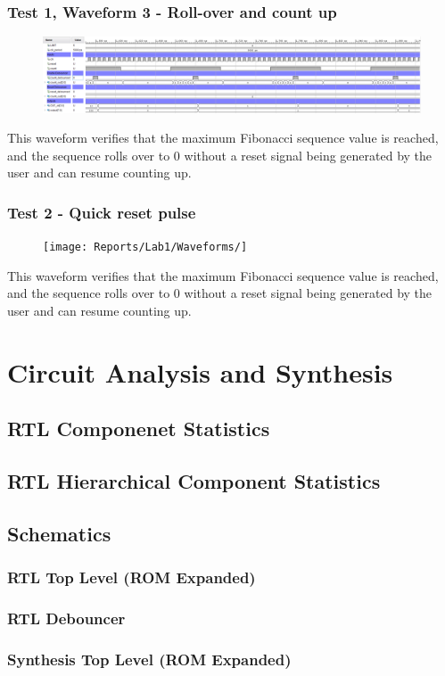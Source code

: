 \documentclass[11pt]{report}
\begin{document}
\subsubsection*{Test 1, Waveform 3 - Roll-over and count up}
\begin{figure}[H]
    \includegraphics[width=\columnwidth]{Reports/Lab1/Waveforms/04_roll-over-and-count.png}
\end{figure}
This waveform verifies that the maximum Fibonacci sequence value is reached, and the sequence rolls over to 0 without a reset signal being generated by the user and can resume counting up.

\subsubsection*{Test 2 - Quick reset pulse}
\begin{figure}[H]
    \texttt{[image: Reports/Lab1/Waveforms/]}
\end{figure}
This waveform verifies that the maximum Fibonacci sequence value is reached, and the sequence rolls over to 0 without a reset signal being generated by the user and can resume counting up.



\section*{Circuit Analysis and Synthesis}

\subsection*{RTL Componenet Statistics}

\subsection*{RTL Hierarchical Component Statistics}

\subsection*{Schematics}

\subsubsection*{RTL Top Level (ROM Expanded)}

\subsubsection*{RTL Debouncer}

\subsubsection*{Synthesis Top Level (ROM Expanded)}
\end{document}
